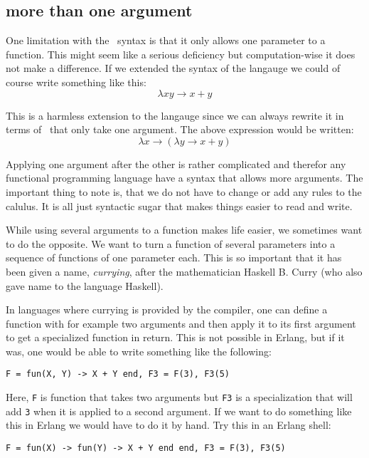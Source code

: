 \documentclass[a4paper,11pt]{article}
\begin{document}
\subsection{more than one argument}

One limitation with the \lamc\ syntax is that it only allows one
parameter to a function. This might seem like a serious deficiency but
computation-wise it does not make a difference. If we extended the
syntax of the langauge we could of course write something like this:
$$\lambda x y \rightarrow x + y$$

This is a harmless extension to the langauge since we can always
rewrite it in terms of \lama\ that only take one argument. The above
expression would be written:
$$\lambda x \rightarrow (\lambda y \rightarrow x + y )$$

Applying one argument after the other is rather complicated and
therefor any functional programming language have a syntax that allows more arguments. The
important thing to note is, that we do not have to change or add any
rules to the calulus. It is all just syntactic sugar that makes
things easier to read and write.

While using several arguments to a function makes life easier,
we sometimes want to do the opposite. We want to
turn a function of several parameters into a sequence of functions of
one parameter each. This is so important that it has been given a
name, {\em currying}, after the mathematician Haskell B. Curry (who also
gave name to the language Haskell).

In languages where currying is provided by the compiler, one can define
a function with for example two arguments and then apply it to its
first argument to get a specialized function in return. This is not
possible in Erlang, but if it was, one would be able to write something
like the following:

\vspace{10pt}
\begin{center}{\tt F = fun(X, Y) ->  X  + Y end, F3 = F(3), F3(5)}
\end{center}
\vspace{10pt}

Here, {\tt F} is function that takes two arguments but {\tt F3} is a
specialization that will add {\tt 3} when it is applied to a second
argument. If we want to do something like this in Erlang we would have
to do it by hand. Try this in an Erlang shell:

\vspace{10pt}
\begin{center}{\tt F = fun(X) -> fun(Y) ->  X  + Y end end, F3 = F(3), F3(5)}
\end{center}
\vspace{10pt}
\end{document}

